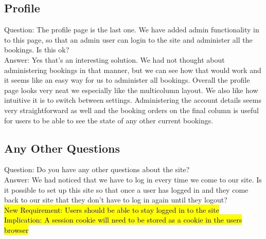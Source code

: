 \documentclass{article}
\begin{document}
\subsection{Profile}
Question: The profile page is the last one. We have added admin functionality in to this page, so that an admin user can login to the site and administer all the bookings. Is this ok?
\\
Answer: Yes that's an interesting solution. We had not thought about administering bookings in that manner, but we can see how that would work and it seems like an easy way for us to administer all bookings. Overall the profile page looks very neat we especially like the multicolumn layout. We also like how intuitive it is to switch between settings. Administering the account details seems very straightforward as well and the booking orders on the final column is useful for users to be able to see the state of any other current bookings.
\\
\subsection{Any Other Questions}
Question: Do you have any other questions about the site?
\\
Answer: We had noticed that we have to log in every time we come to our site. Is it possible to set up this site so that once a user has logged in and they come back to our site that they don't have to log in again until they logout?
\\
\hl{New Requirement: Users should be able to stay logged in to the site 
\\
Implication: A session cookie will need to be stored as a cookie in the users browser}
\\
\end{document}
